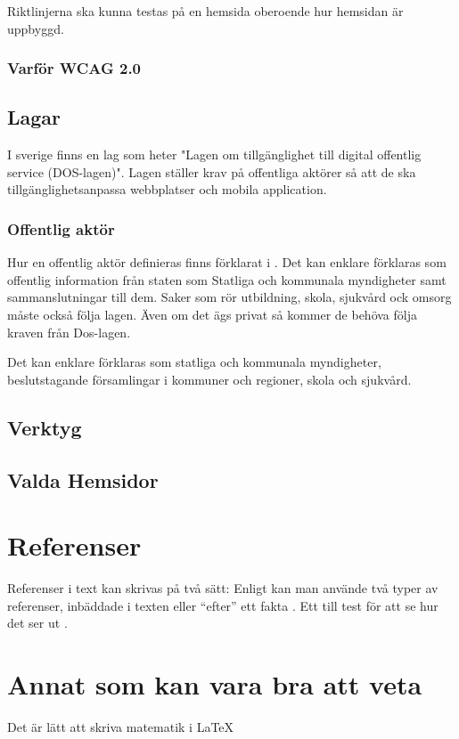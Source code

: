 \documentclass[11p]{article}
\begin{document}
Riktlinjerna ska kunna testas på en hemsida oberoende hur hemsidan är uppbyggd.

\subsubsection{Varför WCAG 2.0}

\subsection{Lagar}
I sverige finns en lag som heter "Lagen om tillgänglighet till digital offentlig service (DOS-lagen)".\parencite{Dos-lagen}
Lagen ställer krav på offentliga aktörer så att de ska tillgänglighetsanpassa webbplatser och mobila application.

\subsubsection{Offentlig aktör}
Hur en offentlig aktör definieras finns förklarat i \textcite{Dos-lagen}.
Det kan enklare förklaras som offentlig information från staten som Statliga och kommunala myndigheter samt sammanslutningar till dem.
Saker som rör utbildning, skola, sjukvård ock omsorg måste också följa lagen.
Även om det ägs privat så kommer de behöva följa kraven från Dos-lagen.

Det kan enklare förklaras som statliga och kommunala myndigheter, beslutstagande församlingar i kommuner och regioner, skola och sjukvård.\parencite{Om_Dos-lage}


\subsection{Verktyg}

\subsection{Valda Hemsidor}


\section{Referenser}
Referenser i text kan skrivas på två sätt: Enligt \textcite{} kan man använde två typer av referenser, inbäddade i texten eller ``efter'' ett fakta \parencite{Fraenkel}. Ett till test för att se hur det ser ut \parencite{fermi}.

\section{Annat som kan vara bra att veta}
Det är lätt att skriva matematik i \LaTeX
\end{document}
